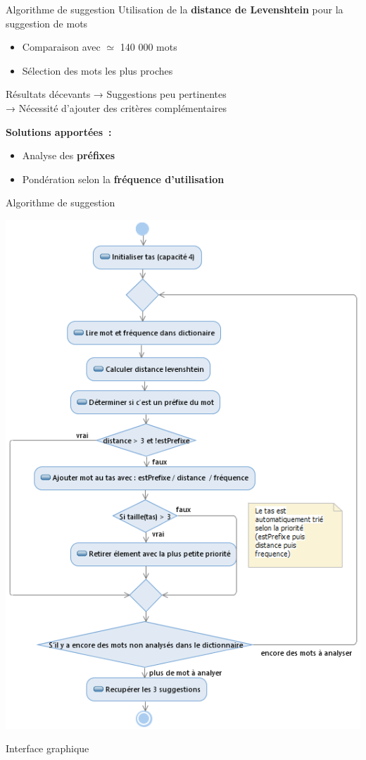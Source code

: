 \begin{frame}{Algorithme de suggestion}
	Utilisation de la \textbf{distance de Levenshtein} pour la suggestion de mots

	\begin{itemize}
		\item Comparaison avec $\simeq$ 140 000 mots
		\item Sélection des mots les plus proches
	\end{itemize}

	\begin{block}{\alert{Résultats décevants}}
		→ Suggestions peu pertinentes\\
		→ Nécessité d’ajouter des critères complémentaires
	\end{block}

	\textbf{Solutions apportées~:}
	\begin{itemize}
		\item Analyse des \textbf{préfixes}
		\item Pondération selon la \textbf{fréquence d'utilisation}
	\end{itemize}
\end{frame}

\begin{frame}{Algorithme de suggestion}
	\vspace*{-0.75cm}
	\begin{center}

		\includegraphics[height=0.98\textheight]{images/uml_diapo.png}
	\end{center}

\end{frame}


\begin{frame}{Interface graphique}

\end{frame}
